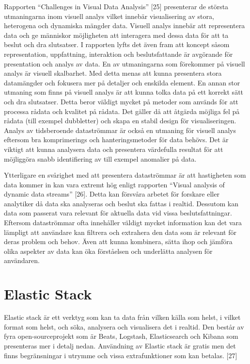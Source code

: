 \documentclass[12pt]{kththesis}
\begin{document}
Rapporten “Challenges in Visual Data Analysis” [25] presenterar de största utmaningarna inom visuell analys vilket innebär visualisering av stora, heterogena och dynamiska mängder data. Visuell analys innebär att representera data och ge människor möjligheten att interagera med dessa data för att ta beslut och dra slutsatser. I rapporten lyfts det även fram att koncept såsom representation, uppfattning, interaktion och beslutsfattande är avgörande för presentation och analys av data. En av utmaningarna som förekommer på visuell analys är visuell skalbarhet. Med detta menas att kunna presentera stora datamängder och fokusera mer på detaljer och enskilda element. En annan stor utmaning som finns på visuell analys är att kunna tolka data på ett korrekt sätt och dra slutsatser. Detta beror väldigt mycket på metoder som används för att processa rådata och kvalitet på rådata. Det gäller då att åtgärda möjliga fel på rådata (till exempel dubbletter) och skapa en stabil design för visualiseringen. Analys av tidsberoende dataströmmar är också en utmaning för visuell analys eftersom bra komprimerings och hanteringsmetoder för data behövs. Det är viktigt att kunna analysera data och presentera värdefulla resultat för att möjliggöra snabb identifiering av till exempel anomalier på data. 

Ytterligare en svårighet med att presentera dataströmmar är att hastigheten som data kommer in kan vara extremt hög enligt rapporten “Visual analysis of dynamic data streams” [26]. Detta kan försvåra arbetet för forskare eller analytiker då data ska analyseras och beslut ska fattas i realtid. Dessutom kan data som passerat vara relevant för aktuella data vid vissa beslutsfattningar. Eftersom dataströmmar ofta innehåller väldigt mycket information kan det vara lämpligt att användare kan filtrera och extrahera den data som är relevant för deras problem och behov. Även att kunna kombinera, sätta ihop och jämföra olika aspekter av data kan öka förståelsen och underlätta analysen för användaren. 

\section{Elastic Stack} 

Elastic stack är ett verktyg som kan ta data från vilken källa som helst, i vilket format som helst, och söka, analysera och visualisera det i realtid. Den består av fyra open-sourceprojekt som är Beats, Logstash, Elasticsearch och Kibana som presenteras mer i detalj nedan. Användning av Elastic stack är gratis men det finns begränsningar i utrymme och vissa extrafunktioner som kan betalas. [27]
\end{document}
